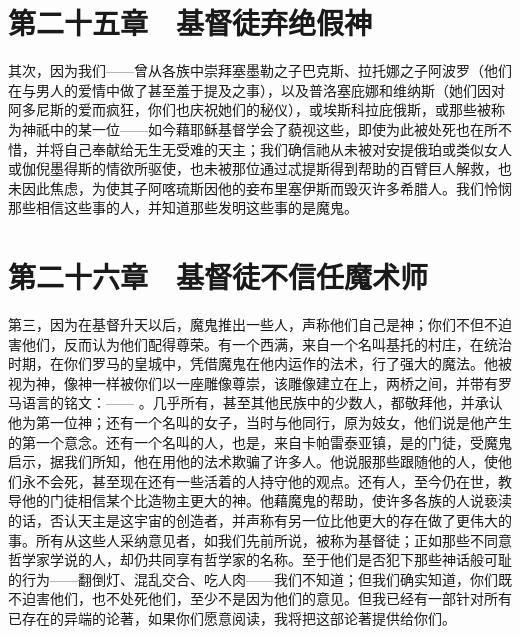 
\section{第二十五章　基督徒弃绝假神}

其次，因为我们——曾从各族中崇拜塞墨勒之子巴克斯、拉托娜之子阿波罗（他们在与男人的爱情中做了甚至羞于提及之事），以及普洛塞庇娜和维纳斯（她们因对阿多尼斯的爱而疯狂，你们也庆祝她们的秘仪），或埃斯科拉庇俄斯，或那些被称为神祇中的某一位——如今藉耶稣基督学会了藐视这些，即使为此被处死也在所不惜，并将自己奉献给无生无受难的天主；我们确信祂从未被对安提俄珀或类似女人或伽倪墨得斯的情欲所驱使，也未被那位通过忒提斯得到帮助的百臂巨人解救，也未因此焦虑，为使其子阿喀琉斯因他的妾布里塞伊斯而毁灭许多希腊人。我们怜悯那些相信这些事的人，并知道那些发明这些事的是魔鬼。\par


\section{第二十六章　基督徒不信任魔术师}

第三，因为在基督升天以后，魔鬼推出一些人，声称他们自己是神；你们不但不迫害他们，反而认为他们配得尊荣。有一个西满，来自一个名叫基托的村庄，在统治时期，在你们罗马的皇城中，凭借魔鬼在他内运作的法术，行了强大的魔法。他被视为神，像神一样被你们以一座雕像尊崇，该雕像建立在上，两桥之间，并带有罗马语言的铭文：——  。几乎所有，甚至其他民族中的少数人，都敬拜他，并承认他为第一位神；还有一个名叫的女子，当时与他同行，原为妓女，他们说是他产生的第一个意念。还有一个名叫的人，也是，来自卡帕雷泰亚镇，是的门徒，受魔鬼启示，据我们所知，他在用他的法术欺骗了许多人。他说服那些跟随他的人，使他们永不会死，甚至现在还有一些活着的人持守他的观点。还有人，至今仍在世，教导他的门徒相信某个比造物主更大的神。他藉魔鬼的帮助，使许多各族的人说亵渎的话，否认天主是这宇宙的创造者，并声称有另一位比他更大的存在做了更伟大的事。所有从这些人采纳意见者，如我们先前所说，被称为基督徒；正如那些不同意哲学家学说的人，却仍共同享有哲学家的名称。至于他们是否犯下那些神话般可耻的行为——翻倒灯、混乱交合、吃人肉——我们不知道；但我们确实知道，你们既不迫害他们，也不处死他们，至少不是因为他们的意见。但我已经有一部针对所有已存在的异端的论著，如果你们愿意阅读，我将把这部论著提供给你们。\par

